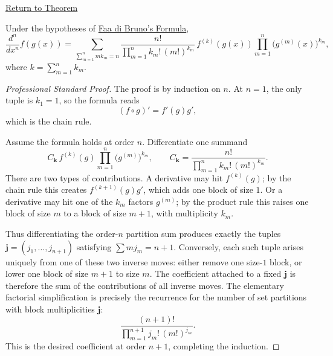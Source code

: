 \newpage
{}
\label{prf:faa-di-bruno}

\begin{remark*}[Return]
\hyperref[thm:faa-di-bruno]{Return to Theorem}
\end{remark*}

\begin{theorem*}
Under the hypotheses of \hyperref[thm:faa-di-bruno]{Faa di Bruno's Formula},
\[
  \frac{d^n}{dx^n}f(g(x))
  =
  \sum_{\sum_{m=1}^{n}mk_m=n}
  \frac{n!}{\prod_{m=1}^{n}k_m!\,(m!)^{k_m}}\,
  f^{(k)}(g(x))
  \prod_{m=1}^{n}\bigl(g^{(m)}(x)\bigr)^{k_m},
\]
where \(k=\sum_{m=1}^{n}k_m\).
\end{theorem*}

\begin{proof}[Professional Standard Proof]
\LRAProofBodyStart
The proof is by induction on \(n\). At \(n=1\), the only tuple is
\(k_1=1\), so the formula reads
\[
  (f\circ g)'=f'(g)g',
\]
which is the chain rule.

Assume the formula holds at order \(n\). Differentiate one summand
\[
  C_{\mathbf{k}}\,f^{(k)}(g)\prod_{m=1}^{n}\bigl(g^{(m)}\bigr)^{k_m},
  \qquad
  C_{\mathbf{k}}=\frac{n!}{\prod_{m=1}^{n}k_m!\,(m!)^{k_m}}.
\]
There are two types of contributions. A derivative may hit
\(f^{(k)}(g)\); by the chain rule this creates
\(f^{(k+1)}(g)g'\), which adds one block of size \(1\). Or a derivative may
hit one of the \(k_m\) factors \(g^{(m)}\); by the product rule this raises
one block of size \(m\) to a block of size \(m+1\), with multiplicity
\(k_m\).

Thus differentiating the order-\(n\) partition sum produces exactly the
tuples \(\mathbf{j}=(j_1,\ldots,j_{n+1})\) satisfying
\(\sum m j_m=n+1\). Conversely, each such tuple arises uniquely from one of
these two inverse moves: either remove one size-\(1\) block, or lower one
block of size \(m+1\) to size \(m\). The coefficient attached to a fixed
\(\mathbf{j}\) is therefore the sum of the contributions of all inverse
moves. The elementary factorial simplification is precisely the recurrence
for the number of set partitions with block multiplicities \(\mathbf{j}\):
\[
  \frac{(n+1)!}{\prod_{m=1}^{n+1}j_m!\,(m!)^{j_m}}.
\]
This is the desired coefficient at order \(n+1\), completing the induction.
\end{proof}

